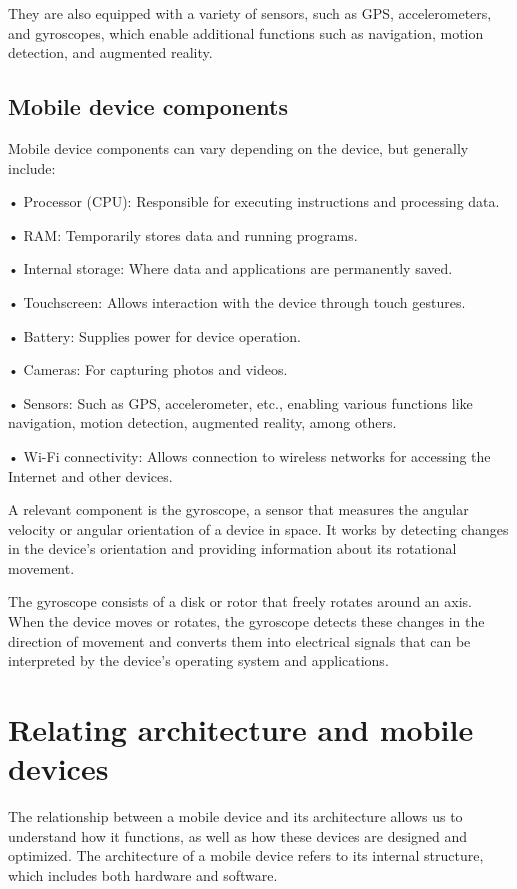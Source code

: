 \documentclass{article}
\begin{document}
\begin{multicols}{2}
		They are also equipped with a variety of sensors, such as GPS, accelerometers, and gyroscopes, which enable additional functions such as navigation, motion detection, and augmented reality.
		
		\subsection{Mobile device components}
		Mobile device components can vary depending on the device, but generally include:
		
		• Processor (CPU): Responsible for executing instructions and processing data.
		
		• RAM: Temporarily stores data and running programs.
		
		• Internal storage: Where data and applications are permanently saved.
		
		• Touchscreen: Allows interaction with the device through touch gestures.
		
		• Battery: Supplies power for device operation.
		
		• Cameras: For capturing photos and videos.
		
		• Sensors: Such as GPS, accelerometer, etc., enabling various functions like navigation, motion detection, augmented reality, among others.
		
		• Wi-Fi connectivity: Allows connection to wireless networks for accessing the Internet and other devices.
		
		A relevant component is the gyroscope, a sensor that measures the angular velocity or angular orientation of a device in space. It works by detecting changes in the device's orientation and providing information about its rotational movement.
		
		The gyroscope consists of a disk or rotor that freely rotates around an axis. When the device moves or rotates, the gyroscope detects these changes in the direction of movement and converts them into electrical signals that can be interpreted by the device's operating system and applications.
		
		\section{Relating architecture and mobile devices}
		
		The relationship between a mobile device and its architecture allows us to understand how it functions, as well as how these devices are designed and optimized. The architecture of a mobile device refers to its internal structure, which includes both hardware and software.
		

\end{multicols}
\end{document}
